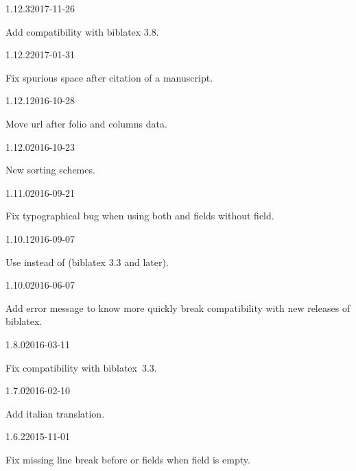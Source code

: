 \documentclass{ltxdockit}[2011/03/25]
\newcommand{\biblatex}{biblatex\xspace}
\begin{document}
\begin{changelog}

\begin{release}{1.12.3}{2017-11-26}
  \item Add compatibility with biblatex 3.8.
\end{release}
\begin{release}{1.12.2}{2017-01-31}
  \item Fix spurious space after citation of a manuscript.
\end{release}

\begin{release}{1.12.1}{2016-10-28}
  \item Move url after folio and columns data.
\end{release}

\begin{release}{1.12.0}{2016-10-23}
  \item New sorting schemes.
\end{release}

\begin{release}{1.11.0}{2016-09-21}
  \item Fix typographical bug when using both  and  fields without  field.
\end{release}

\begin{release}{1.10.1}{2016-09-07}
  \item Use  instead of  (biblatex 3.3 and later).
\end{release}

\begin{release}{1.10.0}{2016-06-07}
  \item Add error message to know more quickly break compatibility with new releases of biblatex.
\end{release}
\begin{release}{1.8.0}{2016-03-11}
	\item Fix compatibility with \biblatex~3.3.
\end{release}

\begin{release}{1.7.0}{2016-02-10}
	\item Add italian translation.
\end{release}

\begin{release}{1.6.2}{2015-11-01}
	\item Fix missing line break before  or  fields when  field is empty.
\end{release}


\end{changelog}
\end{document}
